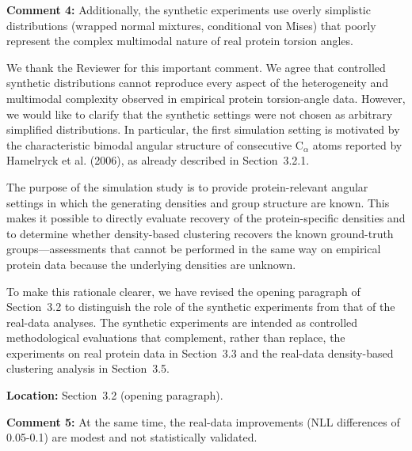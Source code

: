 \documentclass[a4paper,11pt]{article}
\newcommand{\reviewercomment}[2]{%
    \begin{reviewerscomment}
        \textbf{Comment #1:} #2
    \end{reviewerscomment}
}
\newcommand{\response}[1]{%
    \begin{myresponse}
        #1
    \end{myresponse}
    \vspace{5mm}
}
\begin{document}

\reviewercomment{4}{
Additionally, the synthetic experiments use overly simplistic distributions
(wrapped normal mixtures, conditional von Mises) that poorly represent the
complex multimodal nature of real protein torsion angles.
}

\response{
We thank the Reviewer for this important comment. We agree that controlled
synthetic distributions cannot reproduce every aspect of the heterogeneity
and multimodal complexity observed in empirical protein torsion-angle data.
However, we would like to clarify that the synthetic settings were not chosen
as arbitrary simplified distributions. In particular, the first simulation
setting is motivated by the characteristic bimodal angular structure of
consecutive $\mathrm{C}_\alpha$ atoms reported by Hamelryck et al. (2006),
as already described in Section~3.2.1.

The purpose of the simulation study is to provide protein-relevant angular
settings in which the generating densities and group structure are known.
This makes it possible to directly evaluate recovery of the protein-specific
densities and to determine whether density-based clustering recovers the
known ground-truth groups---assessments that cannot be performed in the same
way on empirical protein data because the underlying densities are unknown.

To make this rationale clearer, we have revised the opening paragraph of
Section~3.2 to distinguish the role of the synthetic experiments from that
of the real-data analyses. The synthetic experiments are intended as
controlled methodological evaluations that complement, rather than replace,
the experiments on real protein data in Section~3.3 and the real-data
density-based clustering analysis in Section~3.5.

\textbf{Location:} Section~3.2 (opening paragraph).
}

\reviewercomment{5}{
At the same time, the real-data improvements (NLL differences of 0.05-0.1)
are modest and not statistically validated.
}
\end{document}
